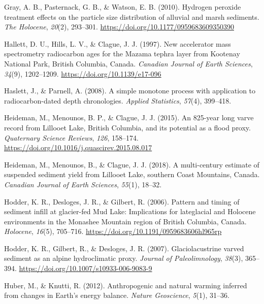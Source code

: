 \documentclass[
  letterpaper,
  DIV=11,
  numbers=noendperiod]{scrartcl}
\newlength{\cslhangindent}
\newlength{\cslentryspacingunit} %
\newenvironment{CSLReferences}[2] %
 {%
  \setlength{\parindent}{0pt}
  \ifodd #1
  \let\oldpar\par
  \def\par{\hangindent=\cslhangindent\oldpar}
  \fi
  \setlength{\parskip}{#2\cslentryspacingunit}
 }%
 {}
\begin{document}
\begin{CSLReferences}{1}{0}
\leavevmode{}%
Gray, A. B., Pasternack, G. B., \& Watson, E. B. (2010). {Hydrogen
peroxide treatment effects on the particle size distribution of alluvial
and marsh sediments}. \emph{The Holocene}, \emph{20}(2), 293--301.
\url{https://doi.org/10.1177/0959683609350390}

\leavevmode{}%
Hallett, D. U., Hills, L. V., \& Clague, J. J. (1997). {New accelerator
mass spectrometry radiocarbon ages for the Mazama tephra layer from
Kootenay National Park, British Columbia, Canada}. \emph{Canadian
Journal of Earth Sciences}, \emph{34}(9), 1202--1209.
\url{https://doi.org/10.1139/e17-096}

\leavevmode{}%
Haslett, J., \& Parnell, A. (2008). {A simple monotone process with
application to radiocarbon-dated depth chronologies}. \emph{Applied
Statistics}, \emph{57}(4), 399--418.

\leavevmode{}%
Heideman, M., Menounos, B. P., \& Clague, J. J. (2015). {An 825-year
long varve record from Lillooet Lake, British Columbia, and its
potential as a flood proxy}. \emph{Quaternary Science Reviews},
\emph{126}, 158--174.
\url{https://doi.org/10.1016/j.quascirev.2015.08.017}

\leavevmode{}%
Heideman, M., Menounos, B., \& Clague, J. J. (2018). {A multi-century
estimate of suspended sediment yield from Lillooet Lake, southern Coast
Mountains, Canada}. \emph{Canadian Journal of Earth Sciences},
\emph{55}(1), 18--32.

\leavevmode{}%
Hodder, K. R., Desloges, J. R., \& Gilbert, R. (2006). {Pattern and
timing of sediment infill at glacier-fed Mud Lake: Implications for
lateglacial and Holocene environments in the Monashee Mountain region of
British Columbia, Canada}. \emph{Holocene}, \emph{16}(5), 705--716.
\url{https://doi.org/10.1191/0959683606hl965rp}

\leavevmode{}%
Hodder, K. R., Gilbert, R., \& Desloges, J. R. (2007). {Glaciolacustrine
varved sediment as an alpine hydroclimatic proxy}. \emph{Journal of
Paleolimnology}, \emph{38}(3), 365--394.
\url{https://doi.org/10.1007/s10933-006-9083-9}

\leavevmode{}%
Huber, M., \& Knutti, R. (2012). {Anthropogenic and natural warming
inferred from changes in Earth's energy balance}. \emph{Nature
Geoscience}, \emph{5}(1), 31--36.


\end{CSLReferences}
\end{document}
